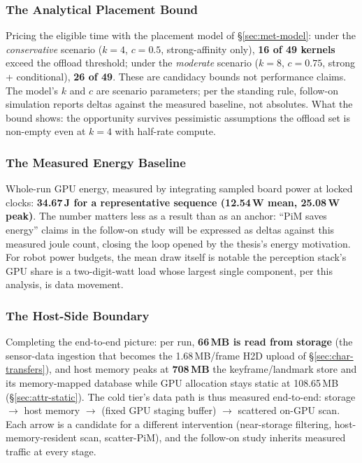 \subsubsection{The Analytical Placement Bound}
\label{sec:syn-model}

Pricing the eligible time with the placement model of \S\ref{sec:met-model}: under the \emph{conservative} scenario ($k{=}4$, $c{=}0.5$, strong-affinity only), \textbf{16 of 49 kernels} exceed the offload threshold; under the \emph{moderate} scenario ($k{=}8$, $c{=}0.75$, strong + conditional), \textbf{26 of 49}. These are candidacy bounds not performance claims. The model's $k$ and $c$ are scenario parameters; per the standing rule, follow-on simulation reports deltas against the measured baseline, not absolutes. What the bound shows: the opportunity survives pessimistic assumptions the offload set is non-empty even at $k{=}4$ with half-rate compute.

\subsubsection{The Measured Energy Baseline}
\label{sec:syn-energy}

Whole-run GPU energy, measured by integrating sampled board power at locked clocks: \textbf{34.67\,J for a representative sequence (12.54\,W mean, 25.08\,W peak)}. The number matters less as a result than as an anchor: “PiM saves energy” claims in the follow-on study will be expressed as deltas against this measured joule count, closing the loop opened by the thesis’s energy motivation. For robot power budgets, the mean draw itself is notable the perception stack’s GPU share is a two-digit-watt load whose largest single component, per this analysis, is data movement.

\subsubsection{The Host-Side Boundary}
\label{sec:syn-host}

Completing the end-to-end picture: per run, \textbf{66\,MB is read from storage} (the sensor-data ingestion that becomes the 1.68\,MB/frame H2D upload of \S\ref{sec:char-transfers}), and host memory peaks at \textbf{708\,MB} the keyframe/landmark store and its memory-mapped database while GPU allocation stays static at 108.65\,MB (\S\ref{sec:attr-static}). The cold tier’s data path is thus measured end-to-end: storage $\rightarrow$ host memory $\rightarrow$ (fixed GPU staging buffer) $\rightarrow$ scattered on-GPU scan. Each arrow is a candidate for a different intervention (near-storage filtering, host-memory-resident scan, scatter-PiM), and the follow-on study inherits measured traffic at every stage.

